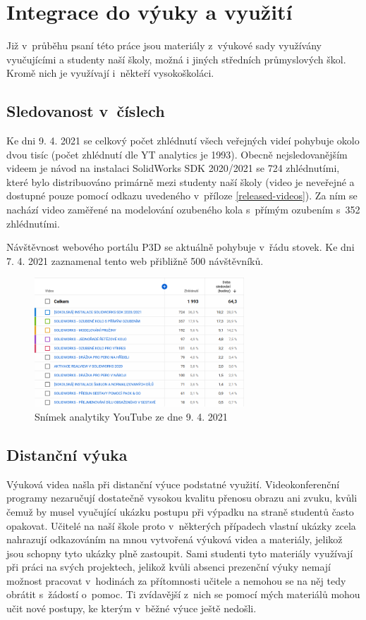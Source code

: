 \chapter{Integrace do výuky a využití}
Již v~průběhu psaní této práce jsou materiály z~výukové sady využívány vyučujícími a studenty naší školy, možná i jiných středních průmyslových škol.
Kromě nich je využívají i~někteří vysokoškoláci.

\section{Sledovanost v~číslech}
Ke dni 9. 4. 2021 se celkový počet zhlédnutí všech veřejných videí pohybuje okolo dvou tisíc (počet zhlédnutí dle YT analytics je 1993).
Obecně nejsledovanějším videem je návod na instalaci SolidWorks SDK 2020/2021 se 724 zhlédnutími, které bylo distribuováno primárně mezi studenty naší školy (video je neveřejné a dostupné pouze pomocí odkazu uvedeného v~příloze \ref{released-videos}).
Za ním se nachází video zaměřené na modelování ozubeného kola s~přímým ozubením s~352 zhlédnutími.

Návštěvnost webového portálu P3D se aktuálně pohybuje v~řádu stovek.
Ke dni 7. 4. 2021 zaznamenal tento web přibližně 500 návštěvníků.

\begin{figure}
    \centering
    \includegraphics[width=0.7\textwidth]{img/020/yt-analytics-09-04-21.png}
    \caption{Snímek analytiky YouTube ze dne 9. 4. 2021}
    \label{fig:yt-analytics}
\end{figure}

\section{Distanční výuka}
Výuková videa našla při distanční výuce podstatné využití.
Videokonferenční programy nezaručují dostatečně vysokou kvalitu přenosu obrazu ani zvuku, kvůli čemuž by musel vyučující ukázku postupu při výpadku na straně studentů často opakovat.
Učitelé na naší škole proto v~některých případech vlastní ukázky zcela nahrazují odkazováním na mnou vytvořená výuková videa a materiály, jelikož jsou schopny tyto ukázky plně zastoupit.
Sami studenti tyto materiály využívají při práci na svých projektech, jelikož kvůli absenci prezenční výuky nemají možnost pracovat v~hodinách za přítomnosti učitele a nemohou se na něj tedy obrátit s~žádostí o~pomoc.
Ti zvídavější z~nich se pomocí mých materiálů mohou učit nové postupy, ke kterým v~běžné výuce ještě nedošli.

